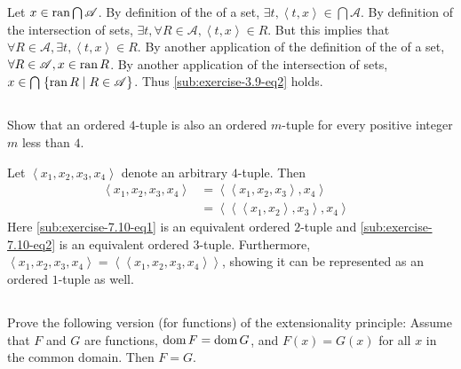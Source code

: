 \documentclass{report}
\begin{document}
\begin{answer}
    Let $x \in \mathop{\text{ran}}{\bigcap{\mathscr{A}}}$.
    By definition of the  of a set,
      $\exists t, \left< t, x \right> \in \bigcap{\mathscr{A}}$.
    By definition of the intersection of sets,
      $\exists t, \forall R \in \mathscr{A}, \left< t, x \right> \in R$.
    But this implies that
      $\forall R \in \mathscr{A}, \exists t, \left< t, x \right> \in R$.
    By another application of the definition of the  of a
      set, $\forall R \in \mathscr{A}, x \in \mathop{\text{ran}}{R}$.
    By another application of the intersection of sets,
      $x \in \bigcap\;\{ \mathop{\text{ran}}{R} \mid R \in \mathscr{A} \}$.
      Thus \eqref{sub:exercise-3.9-eq2} holds.

\end{answer}

\subsection{}%
\label{sub:exercise-3.10}

Show that an ordered $4$-tuple is also an ordered $m$-tuple for every positive
  integer $m$ less than $4$.

\begin{answer}

  Let $\left< x_1, x_2, x_3, x_4 \right>$ denote an arbitrary $4$-tuple.
  Then
    \begin{align}
      \left< x_1, x_2, x_3, x_4 \right>
        & = \left< \left< x_1, x_2, x_3 \right>, x_4 \right>
          & \label{sub:exercise-7.10-eq1} \\
        & = \left< \left< \left< x_1, x_2 \right>, x_3 \right>, x_4 \right>
          & \label{sub:exercise-7.10-eq2}
    \end{align}
  Here \eqref{sub:exercise-7.10-eq1} is an equivalent ordered $2$-tuple and
    \eqref{sub:exercise-7.10-eq2} is an equivalent ordered $3$-tuple.
  Furthermore, $\left< x_1, x_2, x_3, x_4 \right> =
    \left< \left< x_1, x_2, x_3, x_4 \right> \right>$, showing it can be
    represented as an ordered $1$-tuple as well.

\end{answer}

\subsection{}%
\label{sub:exercise-3.11}

Prove the following version (for functions) of the extensionality principle:
  Assume that $F$ and $G$ are functions, $\mathop{\text{dom}}{F} = \mathop{\text{dom}}{G}$, and
  $F(x) = G(x)$ for all $x$ in the common domain.
Then $F = G$.
\end{document}
